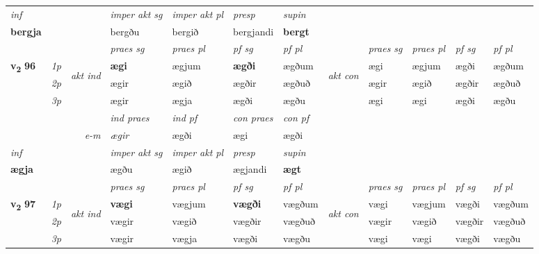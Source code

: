 \begin{longtable}[l]{X>{\footnotesize\itshape}llXXXXlXXXX}
   {\textit{inf}} & &  & \textit{imper akt sg} & \textit{imper akt pl}   & \textit{presp} & \textit{supin}   \\*
  {\textbf{bergja}} & && bergðu  & bergið   & bergjandi &  \textbf{bergt}   \\*

\midrule

 \midrule
 & &   & \textit{praes sg}  & \textit{praes pl}    & \textit{ pf sg} & \textit{pf pl} & & \textit{praes sg}  & \textit{praes pl}    & \textit{pf sg} & \textit{pf pl }  \\ \cmidrule{4-7} \cmidrule{9-12}
 \multirow{2}{*}{{{\textbf{v{\textsubscript{2}}} \Large{\textbf{96}}}}}  & 1p & \multirow{3}{*}{\begin{turn}{90}\textit{akt ind}\end{turn}} & \textbf{ægi} & ægjum & \textbf{ægði} & ægðum & \multirow{3}{*}{\begin{turn}{90}\textit{akt con}\end{turn}} &ægi & ægjum & ægði & ægðum\\*
 & 2p &  &  ægir  & ægið & ægðir & ægðuð & & ægir & ægið & ægðir & ægðuð \\*
 & 3p &  & ægir & ægja & ægði & ægðu & & ægi & ægi& ægði & ægðu \\*
\cmidrule{4-7} \cmidrule{9-12}

   && &  \textit{ind praes} & \textit{ind pf} & \textit{con praes} & \textit{con pf} \\*
\multicolumn{3}{r}{\textit{e-m}} & ægir & ægði & ægi & ægði \\*

\cmidrule{4-7}
   {\textit{inf}} & &  & \textit{imper akt sg} & \textit{imper akt pl}   & \textit{presp} & \textit{supin}   \\*
  {\textbf{ægja}} & && ægðu  & ægið   & ægjandi &  \textbf{ægt}   \\*

\midrule

 & &   & \textit{praes sg}  & \textit{praes pl}    & \textit{ pf sg} & \textit{pf pl} & & \textit{praes sg}  & \textit{praes pl}    & \textit{pf sg} & \textit{pf pl }  \\ \cmidrule{4-7} \cmidrule{9-12}
 \multirow{2}{*}{{{\textbf{v{\textsubscript{2}}} \Large{\textbf{97}}}}}  & 1p & \multirow{3}{*}{\begin{turn}{90}\textit{akt ind}\end{turn}} & \textbf{vægi} & vægjum & \textbf{vægði} & vægðum & \multirow{3}{*}{\begin{turn}{90}\textit{akt con}\end{turn}} &vægi & vægjum & vægði & vægðum\\*
 & 2p &  &  vægir  & vægið & vægðir & vægðuð & & vægir & vægið & vægðir & vægðuð \\*
 & 3p &  & vægir & vægja & vægði & vægðu & & vægi & vægi& vægði & vægðu \\*
\cmidrule{4-7} \cmidrule{9-12}


\end{longtable}
